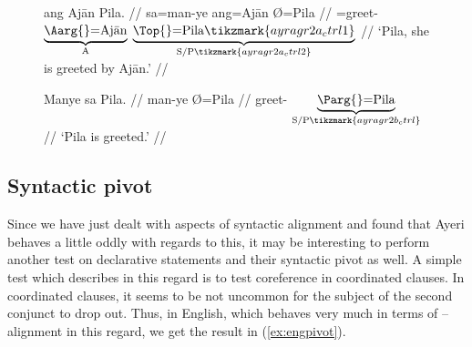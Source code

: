 \begin{figure}
\pex\label{ex:ayragr2}
\a\label{ex:ayragr2_1}\ljudge\ques%
\begingl[aboveglcskip=1.5em, aboveglftskip=1.75em]
	 {ang Ajān} Pila. //
	\glb sa=man-ye {ang=Ajān} {Ø=Pila} //
	\glc \PatT{}=greet-\TsgF{}
		$\underbrace{\text{\Aarg{}=\smash{Ajān}}}_{\text{A}}$
		$\underbrace{\text{\Top{}=Pila}\tikzmark{ayragr2a_ctrl1}}_%
			{\text{S/P}\tikzmark{ayragr2a_ctrl2}}$ //
	\glft `Pila, she is greeted by Ajān.' //
\endgl
{}

\a\label{ex:ayragr2_2}\begingl[aboveglftskip=1.75em]
	\gla Manye {sa Pila}. //
	\glb man-ye Ø=Pila //
	\glc greet-\TsgF{}
		$\underbrace{\text{\Parg{}=Pila}}_%
			{\text{S/P}\tikzmark{ayragr2b_ctrl}}$ //
	\glft `Pila is greeted.' //
\endgl
{}

\xe
\end{figure}


\subsection{Syntactic pivot}
\label{subsubsec:pivot}

Since we have just dealt with aspects of syntactic alignment and found that
Ayeri behaves a little oddly with regards to this, it may be interesting to
perform another test on declarative statements and their syntactic pivot as
well. A simple test which \citet[111--114]{comrie1989} describes in this regard
is to test coreference in coordinated clauses. In coordinated clauses, it seems
to be not uncommon for the subject of the second conjunct to drop out. Thus, in
English, which behaves very much in terms of \Nom{}--\Acc{} alignment in this
regard, we get the result in (\ref{ex:engpivot}).

